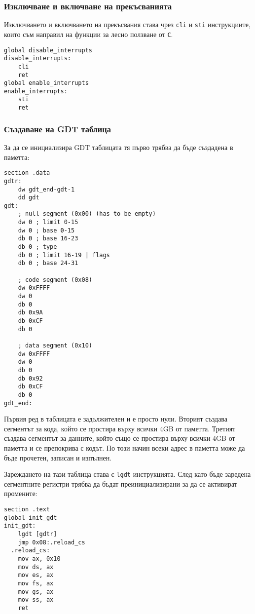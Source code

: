 \subsubsection{Изключване и включване на прекъсванията}
Изключването и включването на прекъсвания става чрез {\tt cli} и {\tt sti} инструкциите, които съм направил на функции за лесно ползване от {\tt C}.
\begin{lstlisting}
global disable_interrupts
disable_interrupts:
    cli
    ret
global enable_interrupts
enable_interrupts:
    sti
    ret
\end{lstlisting}

\subsubsection{Създаване на GDT таблица}
За да се инициализира GDT таблицата тя първо трябва да бъде създадена в паметта:
\begin{lstlisting}
section .data
gdtr:
    dw gdt_end-gdt-1
    dd gdt
gdt:
    ; null segment (0x00) (has to be empty)
    dw 0 ; limit 0-15
    dw 0 ; base 0-15
    db 0 ; base 16-23
    db 0 ; type
    db 0 ; limit 16-19 | flags
    db 0 ; base 24-31

    ; code segment (0x08)
    dw 0xFFFF
    dw 0
    db 0
    db 0x9A
    db 0xCF
    db 0

    ; data segment (0x10)
    dw 0xFFFF
    dw 0
    db 0
    db 0x92
    db 0xCF
    db 0
gdt_end:
\end{lstlisting}
Първия ред в таблицата е задължителен и е просто нули. Вторият създава сегментът за кода, който се простира върху всички 4GB от паметта. Третият създава сегментът за данните, който също се простира върху всички 4GB от паметта и се препокрива с кодът. По този начин всеки адрес в паметта може да бъде прочетен, записан и изпълнен.

Зареждането на тази таблица става с {\tt lgdt} инструкцията. След като бъде заредена сегментните регистри трябва да бъдат преинициализирани за да се активират промените:
\begin{lstlisting}
section .text
global init_gdt
init_gdt:
    lgdt [gdtr]
    jmp 0x08:.reload_cs
  .reload_cs:
    mov ax, 0x10
    mov ds, ax
    mov es, ax
    mov fs, ax
    mov gs, ax
    mov ss, ax
    ret
\end{lstlisting}

